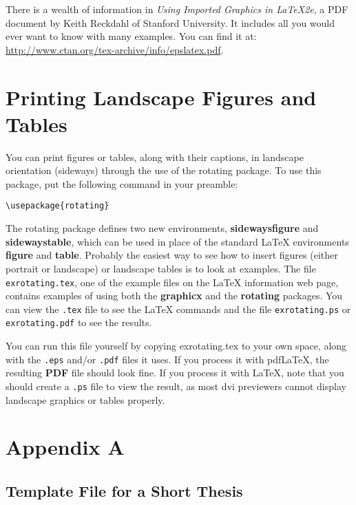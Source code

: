\documentclass[letterpaper,11pt]{article}
\begin{document}
There is a wealth of information in \textit{Using Imported Graphics in {\LaTeX}2e}, a PDF document by
Keith Reckdahl of Stanford University. It includes all you would ever want to know with many
examples. You can find it at:
\url{http://www.ctan.org/tex-archive/info/epslatex.pdf}.


\section{Printing Landscape Figures and Tables}

You can print figures or tables, along with their captions, in landscape orientation (sideways)
through the use of the rotating package. To use this package, put the following command in
your preamble:
\begin{verbatim}
\usepackage{rotating}
\end{verbatim}
The rotating package defines two new environments, \textbf{sidewaysfigure} and \textbf{sidewaystable},
which can be used in place of the standard {\LaTeX} environments \textbf{figure} and \textbf{table}.
Probably the easiest way to see how to insert figures (either portrait or landscape) or landscape
tables is to look at examples. The file \verb|exrotating.tex|, one of the example files on the
{\LaTeX} information web page, contains examples of using both the \textbf{graphicx} and the \textbf{rotating}
packages. You can view the \verb|.tex| file to see the {\LaTeX} commands and the file \verb|exrotating.ps|
or \verb|exrotating.pdf| to see the results.

You can run this file yourself by copying exrotating.tex to your own space, along with the
\verb|.eps| and/or \verb|.pdf| files it uses. If you process it with pdf{\LaTeX}, the resulting \textbf{PDF} file should
look fine. If you process it with {\LaTeX}, note that you should create a \verb|.ps| file to view the result,
as most dvi previewers cannot display landscape graphics or tables properly.

\appendix


\newpage

\section*{Appendix A}
\label{sec:appA}

\subsection*{Template File for a Short Thesis}
\end{document}
